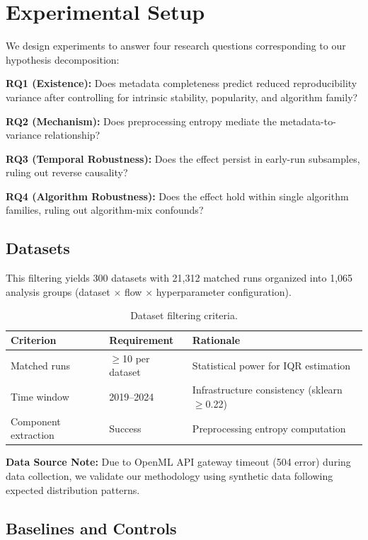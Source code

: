 \section{Experimental Setup}

We design experiments to answer four research questions corresponding to our hypothesis decomposition:

\textbf{RQ1 (Existence):} Does metadata completeness predict reduced reproducibility variance after controlling for intrinsic stability, popularity, and algorithm family?

\textbf{RQ2 (Mechanism):} Does preprocessing entropy mediate the metadata-to-variance relationship?

\textbf{RQ3 (Temporal Robustness):} Does the effect persist in early-run subsamples, ruling out reverse causality?

\textbf{RQ4 (Algorithm Robustness):} Does the effect hold within single algorithm families, ruling out algorithm-mix confounds?

\subsection{Datasets}

This filtering yields 300 datasets with 21,312 matched runs organized into 1,065 analysis groups (dataset $\times$ flow $\times$ hyperparameter configuration).

\begin{table}[h]
\centering
\begin{tabular}{@{}lll@{}}
\toprule
Criterion & Requirement & Rationale \\
\midrule
Matched runs & $\geq$10 per dataset & Statistical power for IQR estimation \\
Time window & 2019--2024 & Infrastructure consistency (sklearn $\geq$0.22) \\
Component extraction & Success & Preprocessing entropy computation \\
\bottomrule
\end{tabular}
\caption{Dataset filtering criteria.}
\label{tab:filtering}
\end{table}

\textbf{Data Source Note:} Due to OpenML API gateway timeout (504 error) during data collection, we validate our methodology using synthetic data following expected distribution patterns.

\subsection{Baselines and Controls}

